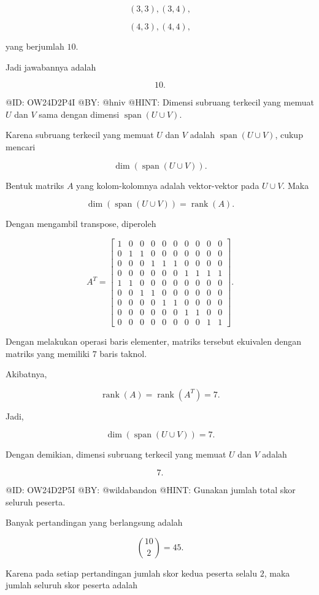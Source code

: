 $$
(3,3),(3,4),
$$

$$
(4,3),(4,4),
$$

yang berjumlah $10$.

Jadi jawabannya adalah

$$
\boxed{10.}
$$

@ID: OW24D2P4I
@BY: @hniv
@HINT: Dimensi subruang terkecil yang memuat $U$ dan $V$ sama dengan dimensi $\operatorname{span}(U\cup V)$.

Karena subruang terkecil yang memuat $U$ dan $V$ adalah $\operatorname{span}(U\cup V)$, cukup mencari

$$
\dim(\operatorname{span}(U\cup V)).
$$

Bentuk matriks $A$ yang kolom-kolomnya adalah vektor-vektor pada $U\cup V$. Maka

$$
\dim(\operatorname{span}(U\cup V))
=\operatorname{rank}(A).
$$

Dengan mengambil transpose, diperoleh

$$
A^T=
\begin{bmatrix}
1&0&0&0&0&0&0&0&0&0\\
0&1&1&0&0&0&0&0&0&0\\
0&0&0&1&1&1&0&0&0&0\\
0&0&0&0&0&0&1&1&1&1\\
1&1&0&0&0&0&0&0&0&0\\
0&0&1&1&0&0&0&0&0&0\\
0&0&0&0&1&1&0&0&0&0\\
0&0&0&0&0&0&1&1&0&0\\
0&0&0&0&0&0&0&0&1&1
\end{bmatrix}.
$$

Dengan melakukan operasi baris elementer, matriks tersebut ekuivalen dengan matriks yang memiliki $7$ baris taknol.

Akibatnya,

$$
\operatorname{rank}(A)
=\operatorname{rank}(A^T)
=7.
$$

Jadi,

$$
\dim(\operatorname{span}(U\cup V))=7.
$$

Dengan demikian, dimensi subruang terkecil yang memuat $U$ dan $V$ adalah

$$
\boxed{7.}
$$

@ID: OW24D2P5I
@BY: @wildabandon
@HINT: Gunakan jumlah total skor seluruh peserta.

Banyak pertandingan yang berlangsung adalah

$$
\binom{10}{2}=45.
$$

Karena pada setiap pertandingan jumlah skor kedua peserta selalu $2$, maka jumlah seluruh skor peserta adalah

